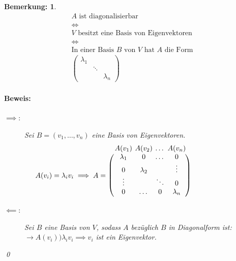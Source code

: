 \documentclass{report}
\newcommand{\lb}{\lambda}
\theoremstyle{customrem}
\newtheorem*{bemerkung}{Bemerkung\textnormal:}
\theoremstyle{customdef}
\renewenvironment{proof}{\paragraph{Beweis: }}{\qed}
\theoremstyle{customenv}
\begin{document}
	\begin{bemerkung}
		\begin{gather*}
			\text{\(A\) ist diagonalisierbar}\\
			\iff\\
			\text{\(V\) besitzt eine Basis von Eigenvektoren}\\
			\iff\\
			\text{In einer Basis \(B\) von \(V\) hat \(A\) die Form} \\
			\begin{pmatrix}
				\lb_1	&		&\\
						&\ddots	&\\
						&		&\lb_n
			\end{pmatrix}
		\end{gather*}
		\begin{proof}
			\begin{description}
				\item[\(\implies\)\normalfont:] Sei \(B=(v_1,\ldots, v_n)\) eine Basis von Eigenvektoren. 
				\[{\setlength\arraycolsep{2pt}
					A(v_i)=\lb_iv_i \implies A = \raise.25cm\hbox{$
					\begin{matrix}
						\left(
						\phantom{\begin{matrix}
							A(v_1)	& A(v_2)& \cdots& A(v_n)\\
							0		& \lb_2	& 		& \vdots\\
							\vdots	& 		& \ddots& 0\\
							0		& \dots & 0		& \lb_n
							\end{matrix}}\right)\kern-3.85cm
						\raise.25cm\hbox{$
						\begin{matrix}
							A(v_1)	& A(v_2)& \dots & A(v_n)\\
							\lb_1	&	0	& \dots	& 0\\
							0		& \lb_2	& 		& \vdots\\
							\vdots	& 		& \ddots& 0\\
							0		& \dots & 0		& \lb_n
						\end{matrix}$}
					\end{matrix}$}\hphantom{A(v_i)=\lb_iv_i \implies A }}
				\]
				\item[\(\impliedby\)\normalfont:] Sei \(B\) eine Basis von \(V\), sodass \(A\) bezüglich \(B\) in Diagonalform ist: \(\rightarrow A(v_i) )\lb_iv_i\implies v_i\) ist ein Eigenvektor.
			\end{description}
		\end{proof}
	\end{bemerkung}
	
\end{document}
